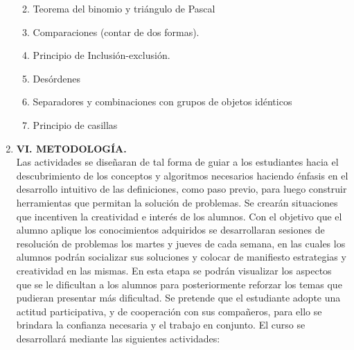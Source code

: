 \begin{enumerate}
\begin{enumerate}
\begin{enumerate}
   \end{enumerate}
  
   \item Teorema del binomio y tri\'angulo de Pascal

   \item Comparaciones (contar de dos formas).
   \item Principio de Inclusión-exclusión. 
   \item Desórdenes
\item Separadores y combinaciones con grupos de objetos idénticos
\item  Principio de casillas
   
    
  
\end{enumerate}





\item {\bf \large VI. METODOLOG\'IA.}\\

Las actividades se diseñaran de tal forma de guiar a los estudiantes hacia el descubrimiento de los conceptos y algoritmos necesarios haciendo énfasis en el desarrollo intuitivo de las definiciones, como paso previo, para luego construir herramientas que permitan la solución de problemas. Se crearán situaciones que incentiven la creatividad e interés de los alumnos. Con el objetivo que el
alumno aplique los conocimientos adquiridos se desarrollaran sesiones de resolución de problemas los martes y jueves de cada semana, en las cuales los alumnos podrán socializar sus soluciones y colocar de manifiesto estrategias y creatividad en las mismas. En esta etapa se podrán visualizar los aspectos que se le dificultan a los alumnos para posteriormente reforzar los temas que pudieran
presentar más dificultad. Se pretende que el estudiante adopte una actitud participativa, y de cooperación con sus compañeros, para ello se brindara la confianza necesaria y el trabajo en conjunto. El curso se desarrollará mediante las siguientes actividades:


\end{enumerate}
